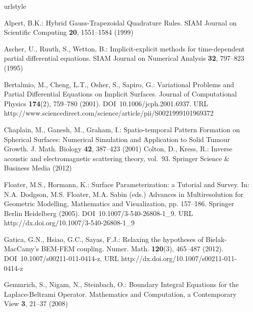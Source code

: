 
%

\begin{thebibliography}{10}
\providecommand{\url}[1]{{#1}}
\providecommand{\urlprefix}{URL }
\expandafter\ifx\csname urlstyle\endcsname\relax
  \providecommand{\doi}[1]{DOI~\discretionary{}{}{}#1}\else
  \providecommand{\doi}{DOI~\discretionary{}{}{}\begingroup
  \urlstyle{rm}\Url}\fi

Alpert, B.K.: {Hybrid Gauss-Trapezoidal Quadrature Rules}.
\newblock SIAM Journal on Scientific Computing \textbf{20}, 1551--1584 (1999)

Ascher, U., Ruuth, S., Wetton, B.: Implicit-explicit methods for time-dependent
  partial differential equations.
\newblock SIAM Journal on Numerical Analysis \textbf{32}, 797--823 (1995)

Bertalmio, M., Cheng, L.T., Osher, S., Sapiro, G.: {Variational Problems and
  Partial Differential Equations on Implicit Surfaces}.
\newblock Journal of Computational Physics \textbf{174}(2), 759--780 (2001).
\newblock \doi{10.1006/jcph.2001.6937}.
\newblock
  \urlprefix\url{http://www.sciencedirect.com/science/article/pii/S0021999101969372}

Chaplain, M., Ganesh, M., Graham, I.: {Spatio-temporal Pattern Formation on
  Spherical Surfaces: Numerical Simulation and Application to Solid Tumour
  Growth}.
\newblock J. Math. Biology \textbf{42}, 387--423 (2001)
Colton, D., Kress, R.: Inverse acoustic and electromagnetic scattering theory,
  vol.~93.
\newblock Springer Science \& Business Media (2012)

Floater, M.S., Hormann, K.: {Surface Parameterization: a Tutorial and Survey}.
\newblock In: N.A. Dodgson, M.S. Floater, M.A. Sabin (eds.) Advances in
  Multiresolution for Geometric Modelling, Mathematics and Visualization, pp.
  157--186. Springer Berlin Heidelberg (2005).
\newblock \doi{10.1007/3-540-26808-1\_9}.
\newblock \urlprefix\url{http://dx.doi.org/10.1007/3-540-26808-1\_9}

Gatica, G.N., Hsiao, G.C., Sayas, F.J.: Relaxing the hypotheses of
  {B}ielak-{M}ac{C}amy's {BEM}-{FEM} coupling.
\newblock Numer. Math. \textbf{120}(3), 465--487 (2012).
\newblock \doi{10.1007/s00211-011-0414-z}.
\newblock \urlprefix\url{http://dx.doi.org/10.1007/s00211-011-0414-z}

Gemmrich, S., Nigam, N., Steinbach, O.: {B}oundary {I}ntegral {E}quations for
  the {L}aplace-{B}eltrami {O}perator.
\newblock Mathematics and Computation, a Contemporary View \textbf{3}, 21--37
  (2008)


\end{thebibliography}
